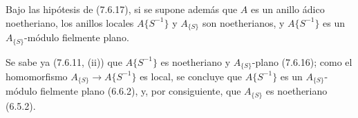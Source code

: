 \begin{corollary}[7.6.18]
\label{0.7.6.18-fr}
Bajo las hipótesis de \textup{(7.6.17)}, si se supone además que $A$ es un anillo
ádico noetheriano, los anillos locales $A\{S^{-1}\}$ y $A_{\{S\}}$ son
noetherianos, y $A\{S^{-1}\}$ es un $A_{\{S\}}$-módulo fielmente plano.
\end{corollary}

Se sabe ya (7.6.11, (ii)) que $A\{S^{-1}\}$ es noetheriano y
$A_{\{S\}}$-plano (7.6.16); como el homomorfismo
$A_{\{S\}}\to A\{S^{-1}\}$ es local, se concluye que $A\{S^{-1}\}$ es
un $A_{\{S\}}$-módulo fielmente plano (6.6.2), y, por consiguiente, que $A_{\{S\}}$
es noetheriano (6.5.2).

